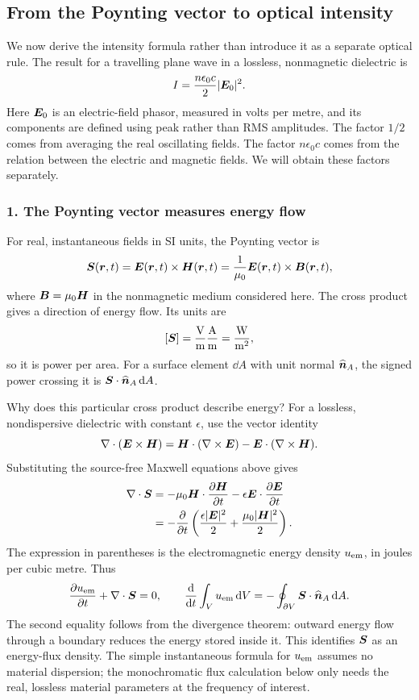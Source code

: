 \subsection*{From the Poynting vector to optical intensity}
We now derive the intensity formula rather than introduce it as a
separate optical rule. The result for a travelling plane wave in a
lossless, nonmagnetic dielectric is
\[
I=\frac{n\epsilon_0c}{2}|\bm{E}_0|^2.
\]
Here $\bm{E}_0$ is an electric-field phasor, measured in volts per metre,
and its components are defined using peak rather than RMS amplitudes.
The factor $1/2$ comes from averaging the real oscillating fields.
The factor $n\epsilon_0c$ comes from the relation between the electric
and magnetic fields. We will obtain these factors separately.

\subsubsection*{1. The Poynting vector measures energy flow}
For real, instantaneous fields in SI units, the Poynting vector is
\begin{equation}
\bm{S}(\bm{r},t)=\bm{E}(\bm{r},t)\times\bm{H}(\bm{r},t)
=\frac{1}{\mu_0}\bm{E}(\bm{r},t)\times\bm{B}(\bm{r},t),
\label{eq:poynting-instant}
\end{equation}
where $\bm{B}=\mu_0\bm{H}$ in the nonmagnetic medium considered here.
The cross product gives a direction of energy flow. Its units are
\[
[\bm{S}]=\frac{\mathrm V}{\mathrm m}
          \frac{\mathrm A}{\mathrm m}
=\frac{\mathrm W}{\mathrm m^2},
\]
so it is power per area. For a surface element $\dd A$ with unit normal
$\widehat{\bm{n}}_A$, the signed power crossing it is
$\bm{S}\cdot\widehat{\bm{n}}_A\,\mathrm{d} A$.

Why does this particular cross product describe energy?
For a lossless, nondispersive dielectric with constant $\epsilon$,
use the vector identity
\[
\nabla\cdot(\bm{E}\times\bm{H})
=\bm{H}\cdot(\nabla\times\bm{E})
-\bm{E}\cdot(\nabla\times\bm{H}).
\]
Substituting the source-free Maxwell equations above gives
\begin{align}
\nabla\cdot\bm{S}
&=-\mu_0\bm{H}\cdot\frac{\partial\bm{H}}{\partial t}
  -\epsilon\bm{E}\cdot\frac{\partial\bm{E}}{\partial t}
\notag\\
&=-\frac{\partial}{\partial t}
  \left(\frac{\epsilon|\bm{E}|^2}{2}
             +\frac{\mu_0|\bm{H}|^2}{2}\right).
\end{align}
The expression in parentheses is the electromagnetic energy density
$u_{\rm em}$, in joules per cubic metre. Thus
\begin{equation}
\frac{\partial u_{\rm em}}{\partial t}+\nabla\cdot\bm{S}=0,
\qquad
\frac{\mathrm{d}}{\mathrm{d} t}\int_Vu_{\rm em}\,\mathrm{d} V
=-\oint_{\partial V}\bm{S}\cdot\widehat{\bm{n}}_A\,\mathrm{d} A.
\label{eq:poynting-conservation}
\end{equation}
The second equality follows from the divergence theorem: outward energy
flow through a boundary reduces the energy stored inside it.
This identifies $\bm{S}$ as an energy-flux density.
The simple instantaneous formula for $u_{\rm em}$ assumes no material
dispersion; the monochromatic flux calculation below only needs the
real, lossless material parameters at the frequency of interest.

